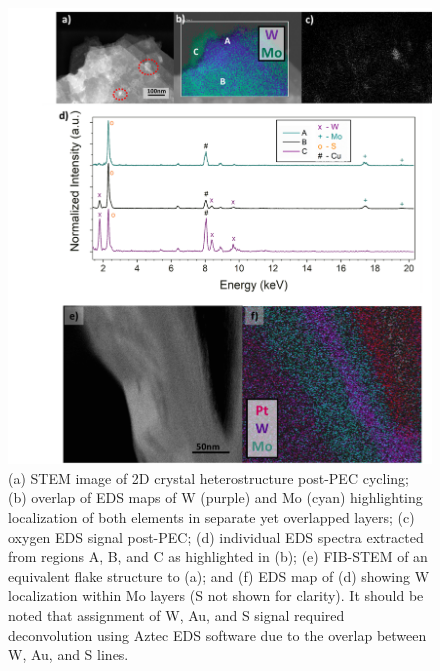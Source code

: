 \begin{figure}[h]
	\begin{center}
		\includegraphics[scale=0.3]{Heterostructures/STEMEDS.png}
		\caption{(a) STEM image of 2D crystal heterostructure post-PEC cycling; (b) overlap of EDS maps of W (purple) and Mo (cyan) highlighting localization of both elements in separate yet overlapped layers; (c) oxygen EDS signal post-PEC; (d) individual EDS spectra extracted from regions A, B, and C as highlighted in (b); (e) FIB-STEM of an equivalent flake structure to (a); and (f) EDS map of (d) showing W localization within Mo layers (S not shown for clarity). It should be noted that assignment of W, Au, and S signal required deconvolution using Aztec EDS software due to the overlap between W, Au, and S lines.}
		\label{fig:HeterostructuresSTEMEDS}
	\end{center}
\end{figure}

